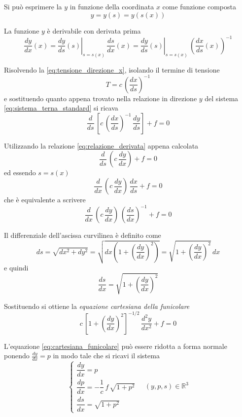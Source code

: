 Si può esprimere la $y$ in funzione della coordinata $x$ come funzione composta
\[
y = y(s) = y(s(x))	
\]

La funzione $y$ è derivabile con derivata prima 
\begin{equation}
	\label{eq:relazione_derivata}
\dfrac{dy}{dx}(x) = \left.\dfrac{dy}{ds}(s)\right|_{s=s(x)}\,\dfrac{ds}{dx}(x) = \left.\dfrac{dy}{ds}(s)\right|_{s=s(x)}\,\left( \dfrac{dx}{ds}(x)\right)^{-1}
\end{equation}

Risolvendo la \eqref{eq:tensione_direzione_x}, isolando il termine di tensione
\[
T = c\,\left(\dfrac{dx}{ds}\right)^{-1}	
\]
e sostituendo quanto appena trovato nella relazione in direzione $y$ del sistema \eqref{eq:sistema_terna_standard} si ricava
\[
\dfrac{d}{ds}\,\left[c\,\left(\dfrac{dx}{ds}\right)^{-1}\,\dfrac{dy}{ds}\right] + f = 0	
\]

Utilizzando la relazione \eqref{eq:relazione_derivata} appena calcolata 
\[
\dfrac{d}{ds}\,\left(c\,\dfrac{dy}{dx}\right) + f = 0	
\]
ed essendo $s = s(x)$ 
\[
\dfrac{d}{dx}\,\left( c\,\dfrac{dy}{dx}\right)\,\dfrac{dx}{ds} + f = 0	
\]
che è equivalente a scrivere
\[
\dfrac{d}{dx}\,\left( c\,\dfrac{dy}{dx}\right)\,\left(\dfrac{ds}{dx}\right)^{-1} + f = 0
\]

Il differenziale dell'ascissa curvilinea è definito come
\[
 ds = \sqrt{dx^2 + dy^2} = \sqrt{dx\left(1 + \left(\dfrac{dy}{dx}\right)^2\right)} = \sqrt{1 + \left(\dfrac{dy}{dx}\right)^2}\,dx
\]
e quindi
\[
\dfrac{ds}{dx} = \sqrt{1 + \left(\dfrac{dy}{dx}\right)^2}	
\]

Sostituendo si ottiene la \emph{equazione cartesiana della funicolare}
\begin{equation}
	\label{eq:cartesiana_funicolare}
	c\,\left[1+ \left(\dfrac{dy}{dx}\right)^2\right]^{-1/2}\,\dfrac{d^2 y}{dx^2} + f = 0
\end{equation}

L'equazione \eqref{eq:cartesiana_funicolare} può essere ridotta a forma normale ponendo $\frac{dy}{dx} = p$ in modo tale che si ricavi il sistema
\[
\begin{cases}
	\dfrac{dy}{dx} = p\\[1.5ex]	
	\dfrac{dp}{dx} = -\dfrac{1}{c}\,f\,\sqrt{1+p^2}\\[1.5ex]
	\dfrac{ds}{dx} = \sqrt{1+p^2}
\end{cases}\quad (y,p,s)\in\mathbb{R}^3
\]

